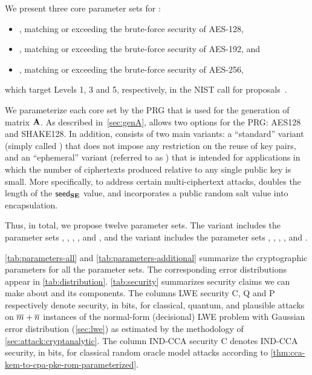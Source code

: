 \documentclass{iacrcc}
\begin{document}
We present three core parameter sets for \FrodoKEM:
\begin{itemize}
\item \FrodoLOne, matching or exceeding the brute-force security of AES-128,
\item \FrodoLThree, matching or exceeding the brute-force security of AES-192, and
\item \FrodoLFive, matching or exceeding the brute-force security of AES-256,
\end{itemize}
\noindent which target Levels 1, 3 and 5, respectively,
in the NIST call for proposals~\cite{}.

We parameterize each core set by the PRG that is used for the generation
of matrix $\mathbf{A}$. 
As described in~\autoref{sec:genA}, \FrodoKEM allows two options for the PRG:
AES128 and SHAKE128. 
In addition, \FrodoKEM consists of two main variants: a ``standard'' variant
(simply called \FrodoKEM) that does not impose any restriction on the reuse of key pairs,
and an ``ephemeral'' variant (referred to as \eFrodoKEM) that is intended for applications
in which the number of ciphertexts produced relative to any single public key is small.
More specifically, to address certain multi-ciphertext attacks, \eFrodoKEM doubles
the length of the ${\mathsf{seed}_{\mathbf{S}\mathbf{E}}}$ value, and incorporates a public random salt value into encapsulation.

Thus, in total, we propose twelve parameter sets. The variant \FrodoKEM includes the
parameter sets \FrodoKEMLOneAES, \FrodoKEMLThreeAES, \FrodoKEMLFiveAES,
\FrodoKEMLOneSHAKE, \FrodoKEMLThreeSHAKE and \FrodoKEMLFiveSHAKE, and the variant \eFrodoKEM
includes the parameter sets \eFrodoKEMLOneAES, \eFrodoKEMLThreeAES, \eFrodoKEMLFiveAES,
\eFrodoKEMLOneSHAKE, \eFrodoKEMLThreeSHAKE and \eFrodoKEMLFiveSHAKE.

\autoref{tab:parameters-all} and \autoref{tab:parameters-additional} summarize
the cryptographic parameters for all the parameter sets.
The corresponding error distributions appear in \autoref{tab:distribution}.
\autoref{tab:security} summarizes security claims we can make about \FrodoKEM
and its components. The columns LWE security C, Q and P respectively denote
security, in bits, for classical, quantum, and plausible attacks on $\overline{m}+\overline{n}$
instances of the normal-form (decisional) LWE problem with Gaussian error
distribution (\autoref{sec:lwe}) as estimated by the methodology of
\autoref{sec:attack:cryptanalytic}. The column IND-CCA security C denotes IND-CCA
security, in bits, for classical random oracle model attacks according to
\autoref{thm:cca-kem-to-cpa-pke-rom-parameterized}.
\end{document}
